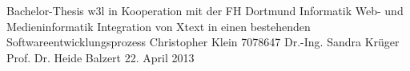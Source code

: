 \documentclass[a4paper,12pt]{scrreprt}
\begin{document}

\titelSeiteDaten
{Bachelor-Thesis} %
{}
{w3l in Kooperation mit der FH Dortmund} %
{Informatik} %
{Web- und Medieninformatik} %
{Integration von Xtext in einen \mbox{bestehenden} Softwareentwicklungsprozess} %
{}
{}
\titelSeiteNamen
{Christopher Klein} %
{7078647} %
{Dr.-Ing. Sandra Krüger} %
{Prof. Dr. Heide Balzert}
{22. April 2013} %


\fontsize{12pt}{13pt}\selectfont



\setcounter{tocdepth}{1}

\tableofcontents


\leerSeiteInhalt


\sloppy
\end{document}
